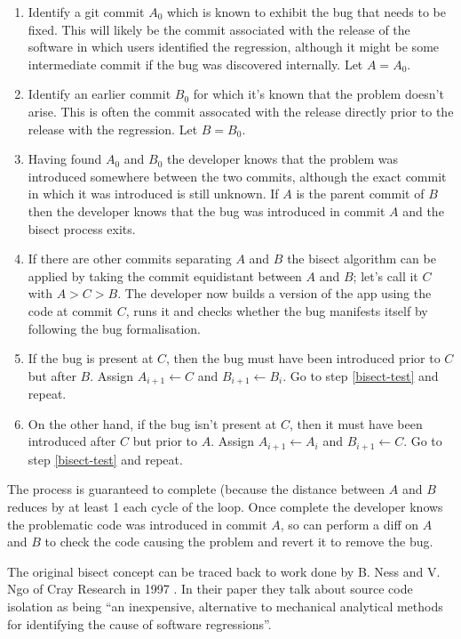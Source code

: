 \documentclass[10pt,journal,compsoc]{IEEEtran}
\begin{document}
\begin{enumerate}
\item \label{bisect-min} Identify a git commit $A_0$ which is known to exhibit the bug that needs to be fixed. This will likely be the commit associated with the release of the software in which users identified the regression, although it might be some intermediate commit if the bug was discovered internally. Let $A = A_0$.
\item \label{bisect-max} Identify an earlier commit $B_0$ for which it's known that the problem doesn't arise. This is often the commit assocated with the release directly prior to the release with the regression. Let $B = B_0$.
\item \label{bisect-test} Having found $A_0$ and $B_0$ the developer knows that the problem was introduced somewhere between the two commits, although the exact commit in which it was introduced is still unknown. If $A$ is the parent commit of $B$ then the developer knows that the bug was introduced in commit $A$ and the bisect process exits.
\item If there are other commits separating $A$ and $B$ the bisect algorithm can be applied by taking the commit equidistant between $A$ and $B$; let's call it $C$ with $A > C > B$. The developer now builds a version of the app using the code at commit $C$, runs it and checks whether the bug manifests itself by following the bug formalisation.
\item If the bug is present at $C$, then the bug must have been introduced prior to $C$ but after $B$. Assign $A_{i + 1} \leftarrow C$ and $B_{i + 1} \leftarrow B_i$. Go to step \ref{bisect-test} and repeat.
\item On the other hand, if the bug isn't present at $C$, then it must have been introduced after $C$ but prior to $A$. Assign $A_{i + 1} \leftarrow A_i$ and $B_{i + 1} \leftarrow C$. Go to step \ref{bisect-test} and repeat.
\end{enumerate}

The process is guaranteed to complete (because the distance between $A$ and $B$ reduces by at least 1 each cycle of the loop. Once complete the developer knows the problematic code was introduced in commit $A$, so can perform a diff on $A$ and $B$ to check the code causing the problem and revert it to remove the bug.

The original {\code bisect} concept can be traced back to work done by B. Ness and V. Ngo of Cray Research in 1997 \cite{ness1997}. In their paper they talk about source code isolation as being ``an inexpensive, alternative to mechanical analytical methods for identifying the cause of software regressions''.
\end{document}
